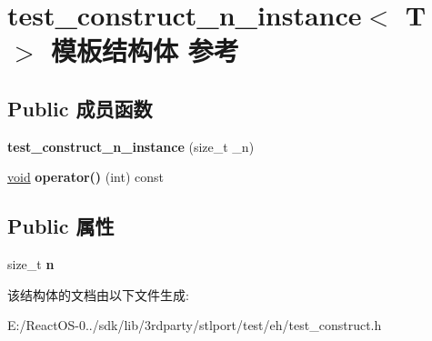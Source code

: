 \hypertarget{structtest__construct__n__instance}{}\section{test\+\_\+construct\+\_\+n\+\_\+instance$<$ T $>$ 模板结构体 参考}
\label{structtest__construct__n__instance}
\subsection*{Public 成员函数}
\begin{DoxyCompactItemize}
\item 
\mbox{\label{structtest__construct__n__instance_a669e7257c4a4b8ab0e643679bda8b2af}} 
{\bfseries test\+\_\+construct\+\_\+n\+\_\+instance} (size\+\_\+t \+\_\+n)
\item 
\mbox{\label{structtest__construct__n__instance_a67756bbfe64adf3c850461ed1840288e}} 
\hyperlink{interfacevoid}{void} {\bfseries operator()} (int) const
\end{DoxyCompactItemize}
\subsection*{Public 属性}
\begin{DoxyCompactItemize}
\item 
\mbox{\label{structtest__construct__n__instance_ab8ffd11257de1ee0306d78a93a05ebbd}} 
size\+\_\+t {\bfseries n}
\end{DoxyCompactItemize}


该结构体的文档由以下文件生成\+:\begin{DoxyCompactItemize}
\item 
E\+:/\+React\+O\+S-\/0../sdk/lib/3rdparty/stlport/test/eh/test\+\_\+construct.\+h\end{DoxyCompactItemize}
